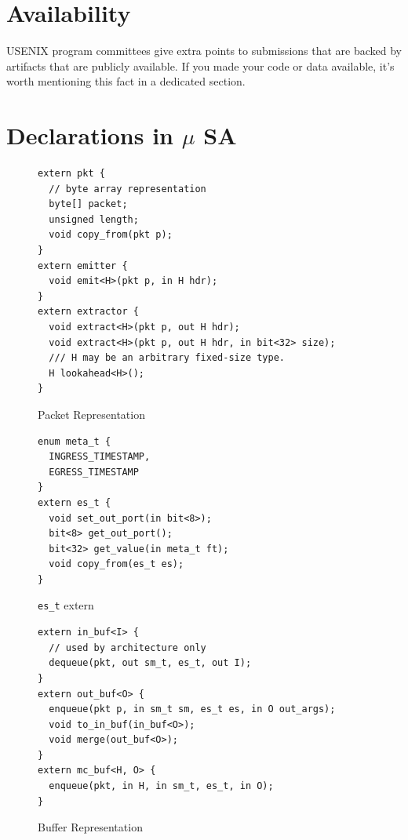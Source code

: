 \section*{Availability}

USENIX program committees give extra points to submissions that are
backed by artifacts that are publicly available. If you made your code
or data available, it's worth mentioning this fact in a dedicated
section.





\appendix
\section{Declarations in $\mu$ SA}
\label{appendix:section:micro-switch-architecture}
\begin{figure}[h]
\begin{lstlisting}[frame=none]
extern pkt {
  // byte array representation
  byte[] packet;
  unsigned length;
  void copy_from(pkt p);
}
extern emitter {
  void emit<H>(pkt p, in H hdr);
}
extern extractor {
  void extract<H>(pkt p, out H hdr);
  void extract<H>(pkt p, out H hdr, in bit<32> size);
  /// H may be an arbitrary fixed-size type.
  H lookahead<H>();
}
\end{lstlisting}
\caption{Packet Representation}
\label{fig:pkt-externs}
\end{figure}

\begin{figure}[h]
\begin{lstlisting}[frame=none]
enum meta_t {
  INGRESS_TIMESTAMP,
  EGRESS_TIMESTAMP
}
extern es_t {
  void set_out_port(in bit<8>);
  bit<8> get_out_port();
  bit<32> get_value(in meta_t ft);
  void copy_from(es_t es);
}
\end{lstlisting}
\caption{\texttt{es\_t} extern}
\label{fig:msa-egress-spec-extern}
\end{figure}

\begin{figure}[h]
\begin{lstlisting}[frame=none]
extern in_buf<I> {
  // used by architecture only
  dequeue(pkt, out sm_t, es_t, out I);
}
extern out_buf<O> {
  enqueue(pkt p, in sm_t sm, es_t es, in O out_args);
  void to_in_buf(in_buf<O>);
  void merge(out_buf<O>);
}
extern mc_buf<H, O> {
  enqueue(pkt, in H, in sm_t, es_t, in O);
}
\end{lstlisting}
\caption{Buffer Representation}
\label{fig:pkt-buf}
\end{figure}

